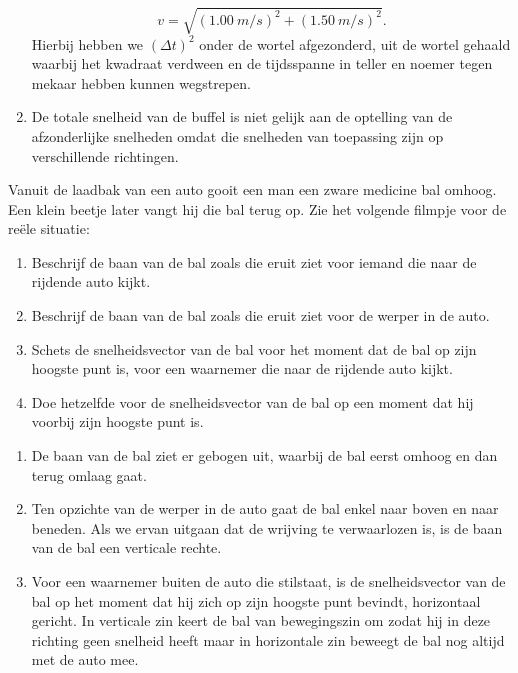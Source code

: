 \documentclass{ximera}
\begin{document}
\begin{denkvraag*}{}
\begin{oplossing}
\begin{enumerate}
        \begin{equation*}
            v=\sqrt{(\SI{1,00}{m/s})^2+(\SI{1,50}{m/s})^2}.
        \end{equation*}
        Hierbij hebben we $(\Delta t)^2$ onder de wortel afgezonderd, uit de wortel gehaald waarbij het kwadraat verdween en de tijdsspanne in teller en noemer tegen mekaar hebben kunnen wegstrepen.
        \item De totale snelheid van de buffel is niet gelijk aan de optelling van de afzonderlijke snelheden omdat die snelheden van toepassing zijn op verschillende richtingen.
    \end{enumerate}
\end{oplossing}
\end{denkvraag*} \nl

\begin{denkvraag*}{}
	Vanuit de laadbak van een auto gooit een man een zware medicine bal omhoog. Een klein beetje later vangt hij die bal terug op. Zie het volgende filmpje voor de reële situatie:
	\begin{center}
	\end{center}
\begin{enumerate}
    \item Beschrijf de baan van de bal zoals die eruit ziet voor iemand die naar de rijdende auto kijkt.
    \item Beschrijf de baan van de bal zoals die eruit ziet voor de werper in de auto.
    \item Schets de snelheidsvector van de bal voor het moment dat de bal op zijn hoogste punt is, voor een waarnemer die naar de rijdende auto kijkt.
    \item Doe hetzelfde voor de snelheidsvector van de bal op een moment dat hij voorbij zijn hoogste punt is.
\end{enumerate}
\begin{oplossing}
    \begin{enumerate}
        \item De baan van de bal ziet er gebogen uit, waarbij de bal eerst omhoog en dan terug omlaag gaat.
        \item Ten opzichte van de werper in de auto gaat de bal enkel naar boven en naar beneden. Als we ervan uitgaan dat de wrijving te verwaarlozen is, is de baan van de bal een verticale rechte.
        \item Voor een waarnemer buiten de auto die stilstaat, is de snelheidsvector van de bal op het moment dat hij zich op zijn hoogste punt bevindt, horizontaal gericht. In verticale zin keert de bal van bewegingszin om zodat hij in deze richting geen snelheid heeft maar in horizontale zin beweegt de bal nog altijd met de auto mee.

\end{enumerate}
\end{oplossing}
\end{denkvraag*}
\end{document}
